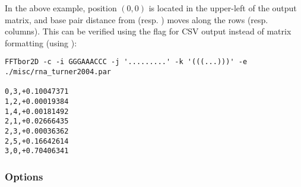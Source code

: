 \documentclass[11pt]{article}
\begin{document}
In the above example, position $(0, 0)$ is located in the upper-left of the output matrix, and base pair distance from \A (resp. \B) moves along the rows (resp. columns). This can be verified using the  flag for CSV output instead of matrix formatting (using ):

\begin{verbatim}
FFTbor2D -c -i GGGAAACCC -j '.........' -k '(((...)))' -e ./misc/rna_turner2004.par

0,3,+0.10047371
1,2,+0.00019384
1,4,+0.00181492
2,1,+0.02666435
2,3,+0.00036362
2,5,+0.16642614
3,0,+0.70406341
\end{verbatim}

\subsubsection{Options} \label{subsub:fftboropt}
\end{document}

